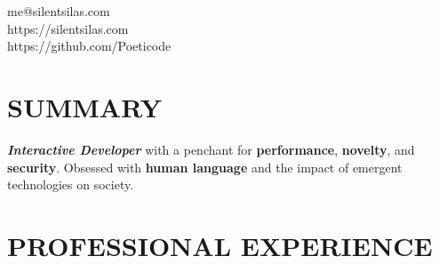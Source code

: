 \documentclass[margin,line]{resume}
\begin{document}
{
    \hfill me@silentsilas.com       \vspace{0mm}\\\vspace{0mm}%
    \hfill https://silentsilas.com           \vspace{0mm}\\\vspace{0mm}%
    \hfill https://github.com/Poeticode \vspace{0mm}\\\vspace{-9mm}%
}

\begin{resume}

    \vspace{-3mm}

    \section{\mysidestyle \textbf{\large{S}\small{UMMARY}}}

    \textbf{\textsl{Interactive Developer}} with a penchant for \textbf{performance}, \textbf{novelty}, and \textbf{security}. Obsessed with \textbf{human language} and the impact of emergent technologies on society. 

    \vspace{-1mm}

\sectionline

    \section{\mysidestyle \textbf{\large{P}\small{ROFESSIONAL} \large{E}\small{XPERIENCE}}}


\end{resume}
\end{document}
